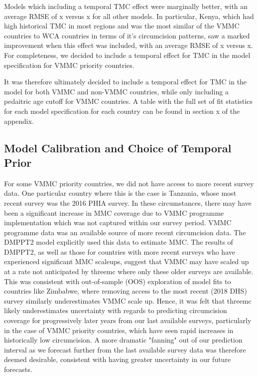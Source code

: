 \documentclass[a4paper, 12pt]{article}
\begin{document}
Models which including a temporal TMC effect were marginally better, with an average RMSE of x versus x for all other models.
In particular, Kenya, which had high historical TMC in most regions and was the most similar of the VMMC countries to WCA countries in terms of it's circumcision patterns, saw a marked improvement when this effect was included, with an average RMSE of x versus x. For completeness, we decided to include a temporal effect for TMC in the model specification for VMMC priority countries.

It was therefore ultimately decided to include a temporal effect for TMC in the model for both VMMC and non-VMMC countries, while only including a pedaitric age cutoff for VMMC countries.
A table with the full set of fit statistics for each model specification for each country can be found in section x of the appendix.

\subsection{Model Calibration and Choice of Temporal Prior}
\label{sec:orgbbc65cb}

For some VMMC priority countries, we did not have access to more recent survey data. 
One particular country where this is the case is Tanzania, whose most recent survey was the 2016 PHIA survey.
In these circumstances, there may have been a significant increase in MMC coverage due to VMMC programme implementation which was not captured within our survey period.
VMMC programme data was an available source of more recent circumcision data.
The DMPPT2 model explicitly used this data to estimate MMC. 
The results of DMPPT2, as well as those for countries with more recent surveys who have experienced significant MMC scaleups, suggest that VMMC may have scaled up at a rate not anticipated by threemc where only these older surveys are available.
This was consistent with out-of-sample (OOS) exploration of model fits to countries like Zimbabwe, where removing access to the most recent (2018 DHS) survey similarly underestimates VMMC scale up.
Hence, it was felt that threemc likely underestimates uncertainty with regards to predicting circumcision coverage for progressively later years from our last available surveys, particularly in the case of VMMC priority countries, which have seen rapid increases in historically low circumcision.
A more dramatic "fanning" out of our prediction interval as we forecast further from the last available survey data was therefore deemed desirable, consistent with having greater uncertainty in our future forecasts. 
\end{document}
